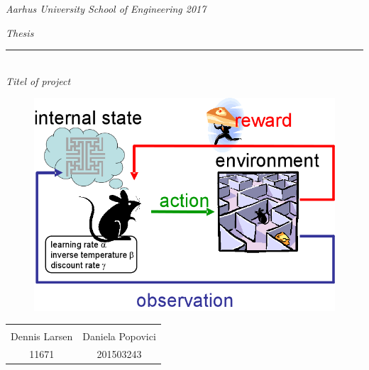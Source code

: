 \thispagestyle{empty}

\begin{center}
\textsl{Aarhus University School of Engineering 2017 } \\ \vspace{0.5cm}

\phantom{hul}

\textsl{\HUGE Thesis } \\ \vspace{0cm}
\rule{15cm}{0.5mm}  \\ \vspace{0.5cm}
\textsl{\LARGE  Titel of project} \\ \vspace{0.5cm}

\vspace{0.5cm}

\begin{figure}[H]
\centering
\includegraphics[width=1\textwidth]{Figures/Frontpage.png}
\label{fig:Forside_foranalyse}
\end{figure}


\vspace{0.7cm}

\begin{table}[H]
	\centering
		\begin{tabular}{c c}
			\underline{\phantom{mmmmmmmmmmmmmm}} & \underline{\phantom{mmmmmmmmmmmmmm}} & \\
			 Dennis Larsen		& Daniela Popovici 	
			 \\
			 11671				& 201503243																	
		\end{tabular}
\end{table}
\end{center}

